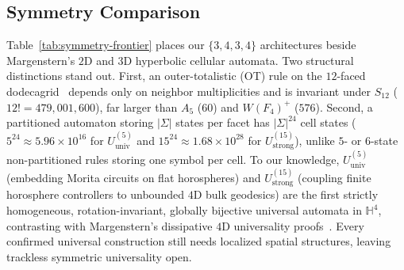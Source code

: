 \subsection{Symmetry Comparison}
\label{subsec:symmetry-comparison}

Table~\ref{tab:symmetry-frontier} places our $\{3,4,3,4\}$ architectures beside Margenstern's $2\mathrm{D}$ and $3\mathrm{D}$ hyperbolic cellular automata. Two structural distinctions stand out. First, an outer-totalistic (OT) rule on the $12$-faced dodecagrid~\cite{margenstern2021outer} depends only on neighbor multiplicities and is invariant under $S_{12}$ ($12! = 479{,}001{,}600$), far larger than $A_5$ ($60$) and $W(F_4)^+$ ($576$). Second, a partitioned automaton storing $|\Sigma|$ states per facet has $|\Sigma|^{24}$ cell states ($5^{24} \approx 5.96 \times 10^{16}$ for $U_{\mathrm{univ}}^{(5)}$ and $15^{24} \approx 1.68 \times 10^{28}$ for $U_{\mathrm{strong}}^{(15)}$), unlike $5$- or $6$-state non-partitioned rules storing one symbol per cell. To our knowledge, $U_{\mathrm{univ}}^{(5)}$ (embedding Morita circuits on flat horospheres) and $U_{\mathrm{strong}}^{(15)}$ (coupling finite horosphere controllers to unbounded $4\mathrm{D}$ bulk geodesics) are the first strictly homogeneous, rotation-invariant, globally bijective universal automata in $\mathbb{H}^4$, contrasting with Margenstern's dissipative $4\mathrm{D}$ universality proofs~\cite{margenstern2008vol2}. Every confirmed universal construction still needs localized spatial structures, leaving trackless symmetric universality open.

